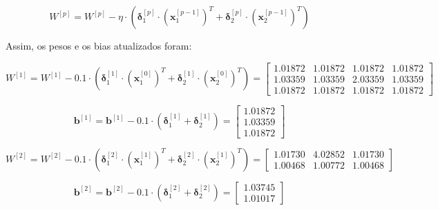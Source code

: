 \documentclass[a4paper,12pt]{article} %
\begin{document}
\begin{enumerate}
\begin{equation}
    W^{[p]} = W^{[p]} - \eta \cdot (\bm{\delta}^{[p]}_1 \cdot (\textbf{x}^{[p-1]}_1)^T + \bm{\delta}^{[p]}_2 \cdot (\textbf{x}^{[p-1]}_2)^T)
\end{equation}

Assim, os pesos e os bias atualizados foram:

\begin{equation*}
    W^{[1]} = W^{[1]} - 0.1 \cdot (\bm{\delta}^{[1]}_1 \cdot (\textbf{x}^{[0]}_1)^T + \bm{\delta}^{[1]}_2 \cdot (\textbf{x}^{[0]}_2)^T) = \begin{bmatrix} 1.01872 & 1.01872 & 1.01872 & 1.01872 \\
                                                                                                                            1.03359 & 1.03359 & 2.03359 & 1.03359 \\
                                                                                                                            1.01872 & 1.01872 & 1.01872 & 1.01872 \end{bmatrix}
\end{equation*}

\begin{equation*}
    \textbf{b}^{[1]} = \textbf{b}^{[1]} - 0.1 \cdot (\bm{\delta}^{[1]}_1 + \bm{\delta}^{[1]}_2) = \begin{bmatrix} 1.01872 \\ 1.03359 \\ 1.01872 \end{bmatrix}
\end{equation*}

\begin{equation*}
    W^{[2]} = W^{[2]} - 0.1 \cdot (\bm{\delta}^{[2]}_1 \cdot (\textbf{x}^{[1]}_1)^T + \bm{\delta}^{[2]}_2 \cdot (\textbf{x}^{[1]}_2)^T) = \begin{bmatrix} 1.01730 & 4.02852 & 1.01730 \\
                                                                                                                            1.00468 & 1.00772 & 1.00468 \end{bmatrix}
\end{equation*}

\begin{equation*}
    \textbf{b}^{[2]} = \textbf{b}^{[2]} - 0.1 \cdot (\bm{\delta}^{[2]}_1 + \bm{\delta}^{[2]}_2) = \begin{bmatrix} 1.03745 \\ 1.01017 \end{bmatrix}
\end{equation*}


\end{enumerate}
\end{document}
